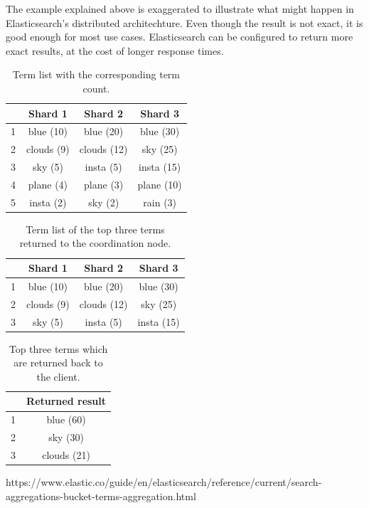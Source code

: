 The example explained above is exaggerated to illustrate what might happen in Elasticsearch's distributed architechture.
Even though the result is not exact, it is good enough for most use cases.
Elasticsearch can be configured to return more exact results,
at the cost of longer response times.

\begin{table}[h!]
    \centering
    \begin{tabular}{|l|c|c|c|}
    \hline
    ~ & \textbf{Shard 1}    & \textbf{Shard 2}     & \textbf{Shard 3}    \\ \hline
    1 & blue (10)  & blue (20)   & blue (30)  \\ \hline
    2 & clouds (9) & clouds (12) & sky (25)   \\ \hline
    3 & sky (5)    & insta (5)   & insta (15) \\ \hline
    4 & plane (4)  & plane (3)   & plane (10) \\ \hline
    5 & insta (2)  & sky (2)     & rain (3)   \\ \hline
    \end{tabular}
    \caption{Term list with the corresponding term count.}
    \label{tbl:shard-term-counts}
\end{table}

\begin{table}[h!]
    \centering
    \begin{tabular}{|l|c|c|c|}
    \hline
    ~ & \textbf{Shard 1}    & \textbf{Shard 2}     & \textbf{Shard 3}    \\ \hline
    1 & blue (10)  & blue (20)   & blue (30)  \\ \hline
    2 & clouds (9) & clouds (12) & sky (25)   \\ \hline
    3 & sky (5)    & insta (5)   & insta (15) \\ \hline
    \end{tabular}
    \caption{Term list of the top three terms returned to the coordination node.}
    \label{tbl:shard-top}
\end{table}

\begin{table}[h!]
    \centering
    \begin{tabular}{|l|c|}
    \hline
    ~ & \textbf{Returned result} \\ \hline
    1 & blue (60)     \\ \hline
    2 & sky (30)    \\ \hline
    3 & clouds (21)       \\ \hline
    \end{tabular}
    \caption{Top three terms which are returned back to the client.}
    \label{tbl:final-result}
\end{table}

https://www.elastic.co/guide/en/elasticsearch/reference/current/search-aggregations-bucket-terms-aggregation.html
